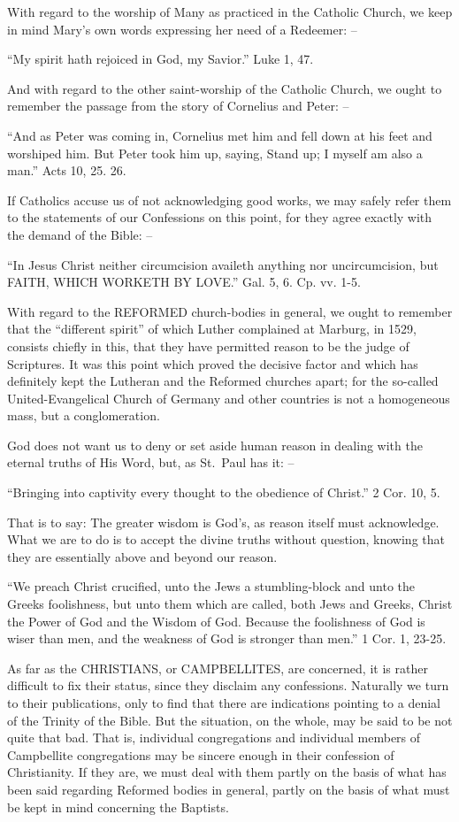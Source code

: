 \documentclass[
]{book}
\begin{document}
With regard to the worship of Many as practiced in the Catholic Church, we keep in mind Mary's own words expressing her need of a Redeemer: --

``My spirit hath rejoiced in God, my Savior.'' Luke 1, 47.

And with regard to the other saint-worship of the Catholic Church, we ought to remember the passage from the story of Cornelius and Peter: --

``And as Peter was coming in, Cornelius met him and fell down at his feet and worshiped him. But Peter took him up, saying, Stand up; I myself am also a man.'' Acts 10, 25. 26.

If Catholics accuse us of not acknowledging good works, we may safely refer them to the statements of our Confessions on this point, for they agree exactly with the demand of the Bible: --

``In Jesus Christ neither circumcision availeth anything nor uncircumcision, but FAITH, WHICH WORKETH BY LOVE.'' Gal. 5, 6. Cp. vv. 1-5.

With regard to the REFORMED church-bodies in general, we ought to remember that the ``different spirit'' of which Luther complained at Marburg, in 1529, consists chiefly in this, that they have permitted reason to be the judge of Scriptures. It was this point which proved the decisive factor and which has definitely kept the Lutheran and the Reformed churches apart; for the so-called United-Evangelical Church of Germany and other countries is not a homogeneous mass, but a conglomeration.

God does not want us to deny or set aside human reason in dealing with the eternal truths of His Word, but, as St.~Paul has it: --

``Bringing into captivity every thought to the obedience of Christ.'' 2 Cor. 10, 5.

That is to say: The greater wisdom is God's, as reason itself must acknowledge. What we are to do is to accept the divine truths without question, knowing that they are essentially above and beyond our reason.

``We preach Christ crucified, unto the Jews a stumbling-block and unto the Greeks foolishness, but unto them which are called, both Jews and Greeks, Christ the Power of God and the Wisdom of God. Because the foolishness of God is wiser than men, and the weakness of God is stronger than men.'' 1 Cor. 1, 23-25.

As far as the CHRISTIANS, or CAMPBELLITES, are concerned, it is rather difficult to fix their status, since they disclaim any confessions. Naturally we turn to their publications, only to find that there are indications pointing to a denial of the Trinity of the Bible. But the situation, on the whole, may be said to be not quite that bad. That is, individual congregations and individual members of Campbellite congregations may be sincere enough in their confession of Christianity. If they are, we must deal with them partly on the basis of what has been said regarding Reformed bodies in general, partly on the basis of what must be kept in mind concerning the Baptists.
\end{document}
